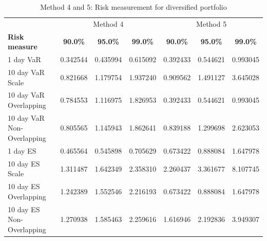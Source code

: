 \begin{table}[H]
    \centering
    \begin{tabular}{@{} l c c c | c c c @{}}
        \toprule
        &\multicolumn{3}{c}{Method 4}&\multicolumn{3}{c}{Method 5}\\
        \textbf{Risk measure} & \textbf{90.0\%} & \textbf{95.0\%} & \textbf{99.0\%}& \textbf{90.0\%} & \textbf{95.0\%} & \textbf{99.0\%} \\
        \midrule
        1 day VaR & 0.342544 & 0.435994 & 0.615092 & 0.392433 & 0.544621 & 0.993045 \\
        10 day VaR Scale & 0.821668 & 1.179754 & 1.937240 & 0.909562 & 1.491127 & 3.645028 \\
        10 day VaR Overlapping & 0.784553 & 1.116975 & 1.826953 & 0.392433 & 0.544621 & 0.993045 \\
        10 day VaR Non-Overlapping & 0.805565 & 1.145943 & 1.862641 & 0.839188 & 1.299698 & 2.623053 \\
        1 day ES & 0.465564 & 0.545898 & 0.705629 & 0.673422 & 0.888084 & 1.647978 \\
        10 day ES Scale & 1.311487 & 1.642349 & 2.358310 & 2.260437 & 3.361677 & 8.107745 \\
        10 day ES Overlapping & 1.242389 & 1.552546 & 2.216193 & 0.673422 & 0.888084 & 1.647978 \\
        10 day ES Non-Overlapping & 1.270938 & 1.585463 & 2.259616 & 1.616946 & 2.192836 & 3.949307 \\
        \bottomrule
    \end{tabular}
    \caption{Method 4 and 5: Risk measurement for diversified portfolio}
    \label{tab:method_4_and_5_diversified_port}
\end{table}
